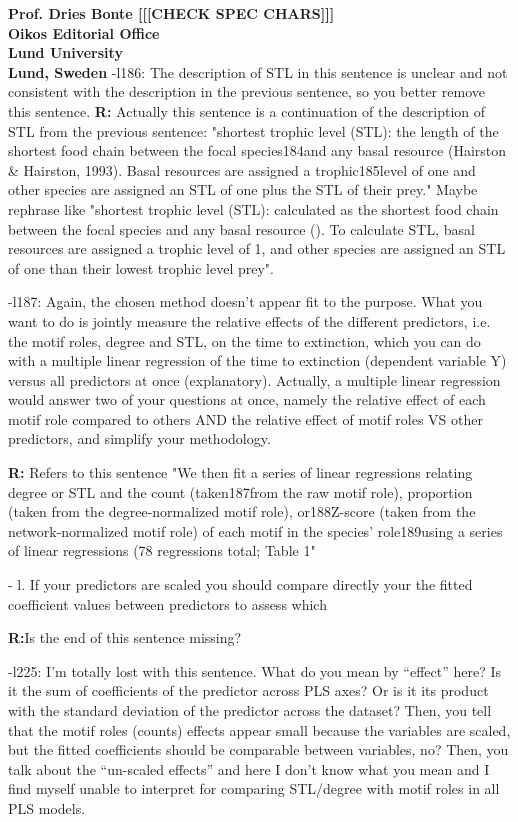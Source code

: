 \documentclass[12pt]{letter}
\begin{document}
\begin{letter}{\bf Prof. Dries Bonte [[[CHECK SPEC CHARS]]]\\
Oikos Editorial Office \\
Lund University \\
Lund, Sweden}
    -l186: The description of STL in this sentence is unclear and not consistent with the description in the previous sentence, so you better remove this sentence.
    \textbf{R:}
    Actually this sentence is a continuation of the description of STL from the previous sentence: "shortest trophic level (STL): the length of the shortest food chain between the focal species184and any basal resource (Hairston & Hairston, 1993). Basal resources are assigned a trophic185level of one and other species are assigned an STL of one plus the STL of their prey." Maybe rephrase like "shortest trophic level (STL): calculated as the shortest food chain between the focal species and any basal resource (). To calculate STL, basal resources are assigned a trophic level of 1, and other species are assigned an STL of one than their lowest trophic level prey".

    -l187: Again, the chosen method doesn’t appear fit to the purpose. What you want to do is jointly measure the relative effects of the different predictors, i.e. the motif roles, degree and STL, on the time to extinction, which you can do with a multiple linear regression of the time to extinction (dependent variable Y) versus all predictors at once (explanatory). Actually, a multiple linear regression would answer two of your questions at once, namely the relative effect of each motif role compared to others AND the relative effect of motif roles VS other predictors, and simplify your methodology.
    
    \textbf{R:}
    Refers to this sentence "We then fit a series of linear regressions relating degree or STL and the count (taken187from the raw motif role), proportion (taken from the degree-normalized motif role), or188Z-score (taken from the network-normalized motif role) of each motif in the species’ role189using a series of linear regressions (78 regressions total; Table 1"

    - l. If your predictors are scaled you should compare directly your the fitted coefficient values between predictors to assess which

    \textbf{R:}Is the end of this sentence missing?

    -l225: I’m totally lost with this sentence. What do you mean by “effect” here? Is it the sum of coefficients of the predictor across PLS axes? Or is it its product with the standard deviation of the predictor across the dataset? Then, you tell that the motif roles (counts) effects appear small because the variables are scaled, but the fitted coefficients should be comparable between variables, no?  Then, you talk about the “un-scaled effects” and here I don’t know what you mean and I find myself unable to interpret for comparing STL/degree with motif roles in all PLS models.


\end{letter}
\end{document}
